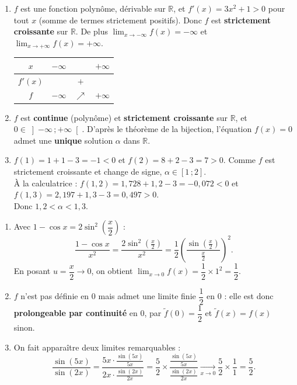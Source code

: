 \documentclass[11pt]{article}
\begin{document}
\begin{corrige}
\begin{enumerate}
\item $f$ est une fonction polynôme, dérivable sur $\mathbb{R}$, et $f'(x)=3x^2+1>0$ pour tout $x$ (somme de termes strictement positifs). Donc $f$ est \textbf{strictement croissante} sur $\mathbb{R}$. De plus $\displaystyle\lim_{x\to-\infty}f(x)=-\infty$ et $\displaystyle\lim_{x\to+\infty}f(x)=+\infty$.
\begin{center}\begin{tabular}{|c|ccc|}\hline $x$ & $-\infty$ & & $+\infty$ \\ \hline $f'(x)$ & & $+$ & \\ \hline $f$ & $-\infty$ & $\nearrow$ & $+\infty$ \\ \hline\end{tabular}\end{center}
\item $f$ est \textbf{continue} (polynôme) et \textbf{strictement croissante} sur $\mathbb{R}$, et $0\in\left]-\infty\,;+\infty\right[$. D'après le théorème de la bijection, l'équation $f(x)=0$ admet une \textbf{unique} solution $\alpha$ dans $\mathbb{R}$.
\item $f(1)=1+1-3=-1<0$ et $f(2)=8+2-3=7>0$. Comme $f$ est strictement croissante et change de signe, $\alpha\in[1\,;2]$.\\
À la calculatrice : $f(1{,}2)=1{,}728+1{,}2-3=-0{,}072<0$ et $f(1{,}3)=2{,}197+1{,}3-3=0{,}497>0$.\\
Donc $\boxed{1{,}2<\alpha<1{,}3}$.
\end{enumerate}
\end{corrige}

\begin{corrige}
\begin{enumerate}
\item Avec $1-\cos x=2\sin^2\!\left(\dfrac{x}{2}\right)$ :
\[\dfrac{1-\cos x}{x^2}=\dfrac{2\sin^2\!\left(\frac{x}{2}\right)}{x^2}=\dfrac{1}{2}\left(\dfrac{\sin\left(\frac{x}{2}\right)}{\frac{x}{2}}\right)^2.\]
En posant $u=\dfrac{x}{2}\to 0$, on obtient $\displaystyle\lim_{x\to 0}f(x)=\dfrac{1}{2}\times 1^2=\dfrac{1}{2}$.
\item $f$ n'est pas définie en $0$ mais admet une limite finie $\dfrac{1}{2}$ en $0$ : elle est donc \textbf{prolongeable par continuité} en $0$, par $\tilde{f}(0)=\dfrac{1}{2}$ et $\tilde{f}(x)=f(x)$ sinon.
\item On fait apparaître deux limites remarquables :
\[\dfrac{\sin(5x)}{\sin(2x)}=\dfrac{5x\cdot\frac{\sin(5x)}{5x}}{2x\cdot\frac{\sin(2x)}{2x}}=\dfrac{5}{2}\times\dfrac{\frac{\sin(5x)}{5x}}{\frac{\sin(2x)}{2x}}\xrightarrow[x\to 0]{}\dfrac{5}{2}\times\dfrac{1}{1}=\dfrac{5}{2}.\]
\end{enumerate}
\end{corrige}
\end{document}
